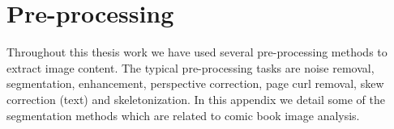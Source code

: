 \chapter{Pre-processing}
\label{app:pre-processing}
\graphicspath{{./chapters/Appendix/figs/}}


Throughout this thesis work we have used several pre-processing methods to extract image content.
The typical pre-processing tasks are noise removal, segmentation, enhancement, perspective correction, page curl removal, skew correction (text) and skeletonization.
In this appendix we detail some of the segmentation methods which are related to comic book image analysis.






